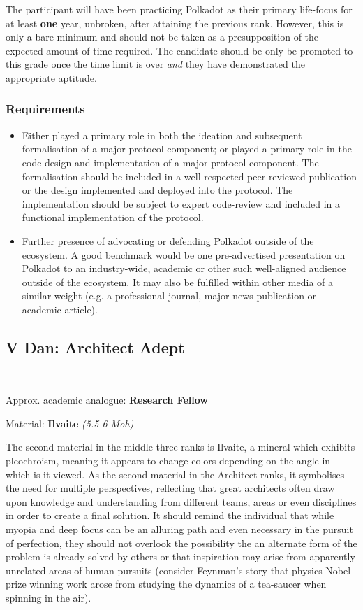 \documentclass[9pt,oneside]{amsart}
\begin{document}
The participant will have been practicing Polkadot as their primary life-focus for at least \textbf{one} year, unbroken, after attaining the previous rank. However, this is only a bare minimum and should not be taken as a presupposition of the expected amount of time required. The candidate should be only be promoted to this grade once the time limit is over \emph{and} they have demonstrated the appropriate aptitude.

\subsubsection{Requirements}\label{requirements-4}

\begin{itemize}
\item Either played a primary role in both the ideation and subsequent formalisation of a major protocol component; or played a primary role in the code-design and implementation of a major protocol component. The formalisation should be included in a well-respected peer-reviewed publication or the design implemented and deployed into the protocol. The implementation should be subject to expert code-review and included in a functional implementation of the protocol.
\item Further presence of advocating or defending Polkadot outside of the ecosystem. A good benchmark would be one pre-advertised presentation on Polkadot to an industry-wide, academic or other such well-aligned audience outside of the ecosystem. It may also be fulfilled within other media of a similar weight (e.g. a professional journal, major news publication or academic article).
\end{itemize}

\subsection{V Dan: Architect Adept}\label{v-dan-architect-adept}~\\


Approx. academic analogue: \textbf{Research Fellow}

Material: \textbf{Ilvaite} \emph{(5.5-6 Moh)}

The second material in the middle three ranks is Ilvaite, a mineral which exhibits pleochroism, meaning it appears to change colors depending on the angle in which is it viewed. As the second material in the Architect ranks, it symbolises the need for multiple perspectives, reflecting that great architects often draw upon knowledge and understanding from different teams, areas or even disciplines in order to create a final solution. It should remind the individual that while myopia and deep focus can be an alluring path and even necessary in the pursuit of perfection, they should not overlook the possibility the an alternate form of the problem is already solved by others or that inspiration may arise from apparently unrelated areas of human-pursuits (consider Feynman's story that physics Nobel-prize winning work arose from studying the dynamics of a tea-saucer when spinning in the air).
\end{document}
